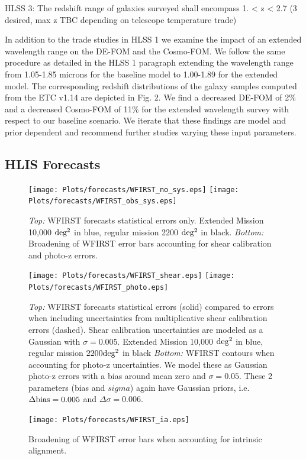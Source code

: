 HLSS 3: The redshift range of galaxies surveyed shall encompass 1. < z < 2.7 (3 desired, max z TBC depending on telescope temperature trade)


In addition to the trade studies in HLSS 1 we examine the impact of an extended wavelength range on the DE-FOM and the Cosmo-FOM. We follow the same procedure as detailed in the HLSS 1 paragraph extending the wavelength range from 1.05-1.85 microns for the baseline model to 1.00-1.89 for the extended model. The corresponding redshift distributions of the galaxy samples computed from the ETC v1.14 are depicted in Fig. 2. We find a decreased DE-FOM of 2\% and a decreased Cosmo-FOM of 11\% for the extended wavelength survey with respect to our baseline scenario. We iterate that these findings are model and prior dependent and recommend further studies varying these input parameters.

\subsection{HLIS Forecasts}
\label{sec:HLISforecasts}
\begin{figure}
\texttt{[image: Plots/forecasts/WFIRST\_no\_sys.eps]}
\texttt{[image: Plots/forecasts/WFIRST\_obs\_sys.eps]}
\caption{\textit{Top:} WFIRST forecasts statistical errors only. Extended Mission 10,000 $\mathrm{deg^2}$ in blue, regular mission 2200 $\mathrm{deg^2}$ in black. \textit{Bottom:} Broadening of WFIRST error bars accounting for shear calibration and photo-z errors.}
         \label{fi:extended}
\end{figure}

\begin{figure}
\texttt{[image: Plots/forecasts/WFIRST\_shear.eps]}
\texttt{[image: Plots/forecasts/WFIRST\_photo.eps]}
\caption{\textit{Top:} WFIRST forecasts statistical errors (solid) compared to errors when including uncertainties from multiplicative shear calibration errors (dashed). Shear calibration uncertainties are modeled as a Gaussian with $\sigma=0.005$. Extended Mission 10,000 $\mathrm{deg^2}$ in blue, regular mission $2200 \mathrm{deg^2}$ in black
\textit{Bottom:} WFIRST contours when accounting for photo-z uncertainties. We model these as Gaussian photo-z errors with a bias around mean zero and $\sigma=0.05$. These 2 parameters (bias and $sigma$) again have Gaussian priors, i.e. $\Delta \mathrm{bias}=0.005$ and $\Delta \sigma=0.006$.}
         \label{fi:sys_obs}
\end{figure}

\begin{figure}
\texttt{[image: Plots/forecasts/WFIRST\_ia.eps]}
\caption{Broadening of WFIRST error bars when accounting for intrinsic alignment.}
         \label{fi:IA}
\end{figure}

